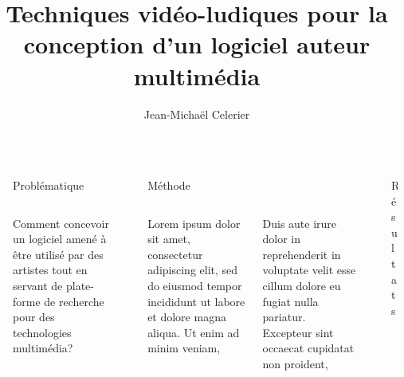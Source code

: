 \documentclass[final]{beamer}
\title{Techniques vidéo-ludiques pour la conception d'un logiciel auteur multimédia}
\author{Jean-Michaël Celerier}
\institute{Laboratoire Bordelais de Recherche en Informatique, Blue Yeti}
\newlength{\sepwid}
\newlength{\onecolwid}
\newlength{\twocolwid}
\begin{document}
\begin{frame}[fragile,t]
   \begin{columns}[t]
     \begin{column}{\sepwid}\end{column}
     \begin{column}{\onecolwid}
      \begin{block}{Problématique}
          \begin{columns}[t]
              \begin{column}{\onecolwid}\justify
                  Comment concevoir un logiciel amené à être utilisé par des artistes tout en servant de plate-forme de recherche pour des technologies multimédia?
                \end{column}
            \end{columns}        
      \end{block}
     \end{column}
     \begin{column}{\sepwid}\end{column}
     \begin{column}{\twocolwid}
         \begin{block}{Méthode}             
             \begin{columns}[t]	                 
                 \begin{column}{\onecolwid}\justify
                     Lorem ipsum dolor sit amet, consectetur adipiscing elit, sed do eiusmod tempor incididunt ut labore et dolore magna aliqua. Ut enim ad minim veniam, 
                     \end{column}
                     \begin{column}{\onecolwid}\justify
                         Duis aute irure dolor in reprehenderit in voluptate velit esse cillum dolore eu fugiat nulla pariatur. Excepteur sint occaecat cupidatat non proident, 
                        \end{column}
                \end{columns}                 
            \end{block}
      \end{column}
      \begin{column}{\sepwid}\end{column}
      \begin{column}{\onecolwid}
          \begin{block}{Résultats}
          	\begin{columns}[t]
          		\begin{column}{\onecolwid}\justify

\end{column}
\end{columns}
\end{block}
\end{column}
\end{columns}
\end{frame}
\end{document}

